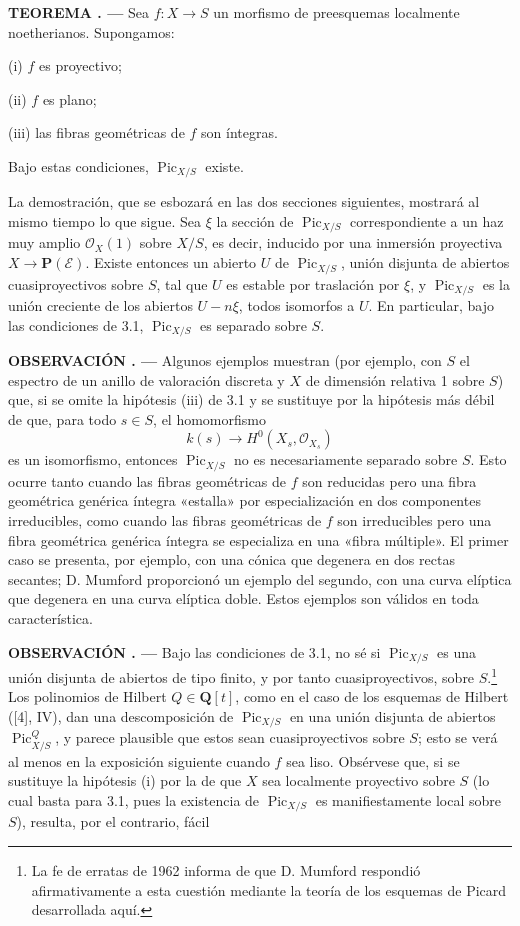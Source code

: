 \documentclass[11pt,twoside,openany]{book}
\numberwithin{equation}{section}
\newcommand{\src}[1]{%
  \phantomsection\hypertarget{src:#1}{}%
  \marginpar{\raggedleft\footnotesize\sffamily #1}%
}
\theoremstyle{plain}
\theoremstyle{definition}
\theoremstyle{remark}
\newcommand{\result}[2]{%
  \par\medskip\noindent\textbf{#1%
  \if\relax\detokenize{#2}\relax\else\space#2\fi. ---}\enspace
}
\newcommand{\FgaUnitKey}{frontmatter}
\renewcommand{\src}[1]{%
  \phantomsection\hypertarget{src:\FgaUnitKey:#1}{}%
  \marginpar{\raggedleft\footnotesize\sffamily #1}%
}
\theoremstyle{plain}
\theoremstyle{definition}
\theoremstyle{remark}
\begin{document}
\result{TEOREMA}{3.1} Sea $f:X\longrightarrow S$ un morfismo de preesquemas
localmente noetherianos. Supongamos:

\noindent (i) $f$ es proyectivo;

\src{149}
\noindent (ii) $f$ es plano;

\noindent (iii) las fibras geométricas de $f$ son íntegras.

Bajo estas condiciones, $\operatorname{Pic}_{X/S}$ existe.

La demostración, que se esbozará en las dos secciones siguientes, mostrará al
mismo tiempo lo que sigue. Sea $\xi$ la sección de
$\operatorname{Pic}_{X/S}$ correspondiente a un haz muy amplio
$\mathcal O_X(1)$ sobre $X/S$, es decir, inducido por una inmersión proyectiva
$X\longrightarrow\mathbf P(\mathcal E)$. Existe entonces un abierto $U$ de
$\operatorname{Pic}_{X/S}$, unión disjunta de abiertos cuasiproyectivos sobre
$S$, tal que $U$ es estable por traslación por $\xi$, y
$\operatorname{Pic}_{X/S}$ es la unión creciente de los abiertos $U-n\xi$,
todos isomorfos a $U$. En particular, bajo las condiciones de 3.1,
$\operatorname{Pic}_{X/S}$ es separado sobre $S$.

\result{OBSERVACIÓN}{3.2} Algunos ejemplos muestran (por ejemplo, con $S$ el
espectro de un anillo de valoración discreta y $X$ de dimensión relativa 1
sobre $S$) que, si se omite la hipótesis (iii) de 3.1 y se sustituye por la
hipótesis más débil de que, para todo $s\in S$, el homomorfismo
\[
k(s)\longrightarrow H^0(X_s,\mathcal O_{X_s})
\]
es un isomorfismo, entonces $\operatorname{Pic}_{X/S}$ no es necesariamente
separado sobre $S$. Esto ocurre tanto cuando las fibras geométricas de $f$ son
reducidas pero una fibra geométrica genérica íntegra «estalla» por
especialización en dos componentes irreducibles, como cuando las fibras
geométricas de $f$ son irreducibles pero una fibra geométrica genérica íntegra
se especializa en una «fibra múltiple». El primer caso se presenta, por ejemplo,
con una cónica que degenera en dos rectas secantes; D. Mumford proporcionó un
ejemplo del segundo, con una curva elíptica que degenera en una curva elíptica
doble. Estos ejemplos son válidos en toda característica.

\result{OBSERVACIÓN}{3.3} Bajo las condiciones de 3.1, no sé si
$\operatorname{Pic}_{X/S}$ es una unión disjunta de abiertos de tipo finito, y
por tanto cuasiproyectivos, sobre $S$.\footnote{La fe de erratas de 1962 informa de
que D. Mumford respondió afirmativamente a esta cuestión mediante la teoría de
los esquemas de Picard desarrollada aquí.} Los polinomios de Hilbert
$Q\in\mathbf Q[t]$, como en el caso de los esquemas de Hilbert ([4], IV), dan
una descomposición de $\operatorname{Pic}_{X/S}$ en una unión disjunta de
abiertos $\operatorname{Pic}^{Q}_{X/S}$, y parece plausible que estos sean
cuasiproyectivos sobre $S$; esto se verá al menos en la exposición siguiente
cuando $f$ sea liso. Obsérvese que, si se sustituye la hipótesis (i) por la de
que $X$ sea localmente proyectivo sobre $S$ (lo cual basta para 3.1, pues la
existencia de $\operatorname{Pic}_{X/S}$ es manifiestamente local sobre $S$),
resulta, por el contrario, fácil
\end{document}
